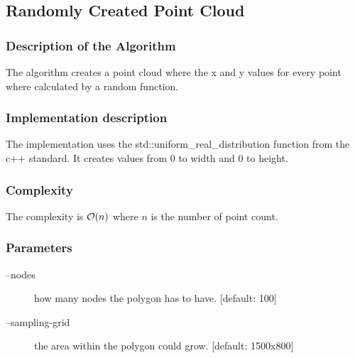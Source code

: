 \subsection{Randomly Created Point Cloud}
\subsubsection{Description of the Algorithm}
The algorithm creates a point cloud where the x and y values for every point
where calculated by a random function.

\subsubsection{Implementation description}
The implementation uses the std::uniform\_real\_distribution function from the
c++ standard. It creates values from 0 to width and 0 to height.

\subsubsection{Complexity}
The complexity is $\mathcal{O}(n)$ where $n$ is the number of point count.

\subsubsection{Parameters}
\begin{description}
  \item [--nodes] how many nodes the polygon has to have. [default: 100]
  \item [--sampling-grid] the area within the polygon could grow. [default: 1500x800]
\end{description}


